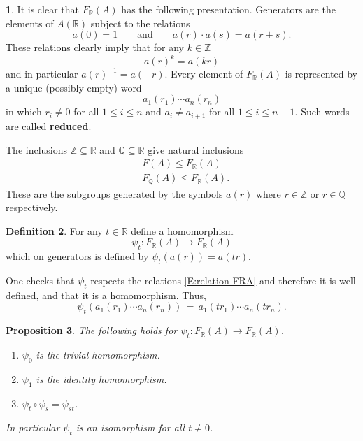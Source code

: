 \documentclass[12pt]{amsart}
\newtheorem{prop}{Proposition}[section]
\theoremstyle{definition}
\newtheorem{defn}[prop]{Definition}
\newtheorem{void}[prop]{}
\def\QQ{\ensuremath{\mathbb{Q}}}
\def\RR{\ensuremath{\mathbb{R}}}
\def\ZZ{\ensuremath{\mathbb{Z}}}
\def\Free{F}
\begin{document}
\begin{void}\label{V:remarks on FRA}
It is clear that $\Free_\RR(A)$ has the following presentation.
Generators are the elements of $A(\RR)$ subject to the relations
\begin{equation}\label{E:relation FRA}
a(0)=1 \qquad \text{and} \qquad a(r) \cdot a(s) =a(r+s).
\end{equation}
These relations clearly imply that for any $k \in \ZZ$
\[
a(r)^k = a(kr)
\]
and in particular $a(r)^{-1}=a(-r)$.
Every element of $\Free_\RR(A)$ is represented by a unique (possibly empty) word 
\[
a_1(r_1) \cdots a_n(r_n)
\]
in which $r_i \neq 0$ for all $1 \leq i \leq n$ and $a_i \neq a_{i+1}$ for all $1 \leq i \leq n-1$.
Such words are called {\bf reduced}.


The inclusions $\ZZ \subseteq \RR$ and $\QQ \subseteq \RR$ give natural inclusions
\begin{align*}
& \Free(A) \leq \Free_\RR(A) \\
& \Free_\QQ(A) \leq \Free_\RR(A).
\end{align*}
These are the subgroups generated by the symbols $a(r)$ where $r \in \ZZ$ or $r \in \QQ$ respectively.
\end{void}




\begin{defn}\label{D:psi_t}
For any $t \in \RR$ define a homomorphism 
\[
\psi_t \colon \Free_\RR(A) \to \Free_\RR(A)
\]
 which on generators is defined by $\psi_t(a(r))=a(tr)$.
\end{defn}

One checks that $\psi_t$ respects the relations \eqref{E:relation FRA} and therefore it is well defined, and that it is a homomorphism.
Thus, 
\begin{equation}\label{E:psi-t-explicit}
\psi_t \left( a_1(r_1) \cdots a_n(r_n) \right) \, = \,  a_1(tr_1) \cdots a_n(tr_n).
\end{equation}




\begin{prop}\label{P:psit monoidal properties}
The following holds for $\psi_t \colon \Free_\RR(A) \to \Free_\RR(A)$.
\begin{enumerate}[label=(\roman*)]
\item $\psi_0$ is the trivial homomorphism.
\item $\psi_1$ is the identity homomorphism.
\item $\psi_t \circ \psi_s = \psi_{st}$.
\end{enumerate}
In particular 
$\psi_t$ is an isomorphism for all $t \neq 0$.
\end{prop}
\end{document}
